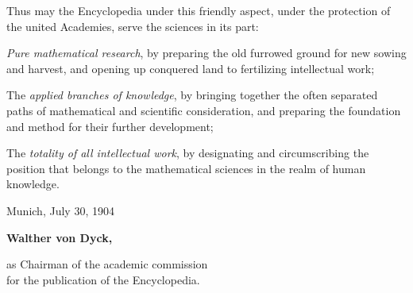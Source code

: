 \thispagestyle{fancy}

\vspace{0.5cm}

Thus may the Encyclopedia under this friendly aspect, under the protection of the united Academies, serve the sciences in its part:

\textit{Pure mathematical research}, by preparing the old furrowed ground for new sowing and harvest, and opening up conquered land to fertilizing intellectual work;

The \textit{applied branches of knowledge}, by bringing together the often separated paths of mathematical and scientific consideration, and preparing the foundation and method for their further development;

The \textit{totality of all intellectual work}, by designating and circumscribing the position that belongs to the mathematical sciences in the realm of human knowledge.

\vspace{1cm}
Munich, July 30, 1904

\vspace{0.5cm}

\begin{minipage}{1.35\textwidth}
\begin{flushright}
\centering
\textbf{Walther von Dyck,}

as Chairman of the academic commission\\
for the publication of the Encyclopedia.
\end{flushright}
\end{minipage}
